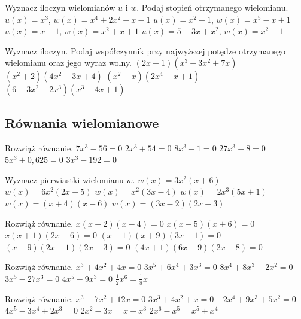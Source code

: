 \documentclass[12pt,a4paper]{article}
\begin{document}
	\ZbiorZadanieTwoXTwo
	{Wyznacz iloczyn wielomianów $u$ i $w$. Podaj stopień otrzymanego wielomianu.}
	{$u(x)=x^3$, $w(x)=x^4+2x^2-x-1$}
	{$u(x)=x^2-1$, $w(x)=x^5-x+1$}
	{$u(x)=x-1$, $w(x)=x^2+x+1$}
	{$u(x)=5-3x+x^2$, $w(x)=x^2-1$}
	
	\ZbiorZadanieTwoXTwo
	{Wyznacz iloczyn. Podaj współczynnik przy najwyższej potędze otrzymanego wielomianu oraz jego wyraz wolny.}
	{$(2x-1)(x^3-3x^2+7x)$}
	{$(x^2+2)(4x^2-3x+4)$}
	{$(x^2-x)(2x^4-x+1)$}
	{$(6-3x^2-2x^3)(x^3-4x+1)$}
	
	\newpage
	
	\subsection{Równania wielomianowe}
	

	\ZbiorZadanieTwoXThree
	{Rozwiąż równanie.}
	{$7x^3-56=0$}
	{$2x^3+54=0$}
	{$8x^3-1=0$}
	{$27x^3+8=0$}
	{$5x^3+0,625=0$}
	{$3x^3-192=0$}
	
	\ZbiorZadanieTwoXThree
	{Wyznacz pierwiastki wielomianu $w$.}
	{$w(x)=3x^2(x+6)$}
	{$w(x)=6x^2(2x-5)$}
	{$w(x)=x^2(3x-4)$}
	{$w(x)=2x^3(5x+1)$}
	{$w(x)=(x+4)(x-6)$}
	{$w(x)=(3x-2)(2x+3)$}
	
	\ZbiorZadanieTwoXThree
	{Rozwiąż równanie.}
	{$x(x-2)(x-4)=0$}
	{$x(x-5)(x+6)=0$}
	{$x(x+1)(2x+6)=0$}
	{$(x+1)(x+9)(3x-1)=0$}
	{$(x-9)(2x+1)(2x-3)=0$}
	{$(4x+1)(6x-9)(2x-8)=0$}
	
	\ZbiorZadanieTwoXThree
	{Rozwiąż równanie.}
	{$x^3+4x^2+4x=0$}
	{$3x^5+6x^4+3x^3=0$}
	{$8x^4+8x^3+2x^2=0$}
	{$3x^5-27x^3=0$}
	{$4x^5-9x^3=0$}
	{$\frac{1}{2}x^6=\frac{1}{8}x$}
	
	\ZbiorZadanieTwoXThree
	{Rozwiąż równanie.}
	{$x^3-7x^2+12x=0$}
	{$3x^3+4x^2+x=0$}
	{$-2x^4+9x^3+5x^2=0$}
	{$4x^5-3x^4+2x^3=0$}
	{$2x^2-3x=x-x^3$}
	{$2x^6-x^5=x^5+x^4$}
	
\end{document}
